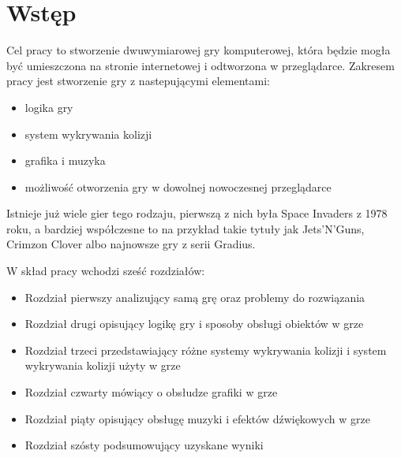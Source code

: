 \chapter{Wstęp}
\thispagestyle{chapterBeginStyle}

Cel pracy to stworzenie dwuwymiarowej gry komputerowej, która będzie mogła być umieszczona na stronie internetowej i odtworzona w przeglądarce.
Zakresem pracy jest stworzenie gry z nastepującymi elementami:
\begin{itemize}
	\item logika gry
	\item system wykrywania kolizji
	\item grafika i muzyka
	\item możliwo\'sć otworzenia gry w dowolnej nowoczesnej przeglądarce
\end{itemize}

Istnieje już wiele gier tego rodzaju, pierwszą z nich była Space Invaders z 1978 roku, a bardziej współczesne to na przykład takie tytuły jak Jets'N'Guns, Crimzon Clover albo najnowsze gry z serii Gradius.

W skład pracy wchodzi sze\'sć rozdziałów:
\begin{itemize}
	\item Rozdział pierwszy analizujący samą grę oraz problemy do rozwiązania
	\item Rozdział drugi opisujący logikę gry i sposoby obsługi obiektów w grze
	\item Rozdział trzeci przedstawiający różne systemy wykrywania kolizji i system wykrywania kolizji użyty w grze
	\item Rozdział czwarty mówiący o obsłudze grafiki w grze
	\item Rozdział piąty opisujący obsługę muzyki i efektów dźwiękowych w grze
	\item Rozdział szósty podsumowujący uzyskane wyniki
\end{itemize}

\cleardoublepage
